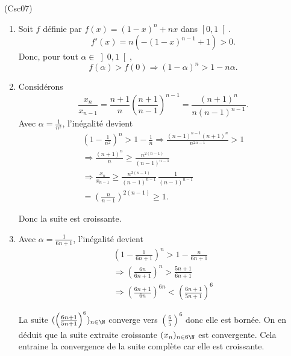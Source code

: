 \begin{tiny}(Csc07)\end{tiny}
\begin{enumerate}
  \item Soit $f$ définie par $f(x) = (1-x)^n + nx$ dans $\left[ 0, 1 \right[$.
\[
  f'(x) = n \left( -(1-x)^{n-1} +1\right) > 0.
\]
Donc, pour tout $\alpha \in \left]0 , 1 \right[$,
\[
  f(\alpha) > f(0)
  \Rightarrow (1- \alpha)^n > 1 - n\alpha.
\]

  \item Considérons 
\[
  \frac{x_{n}}{x_{n-1}} = \frac{n+1}{n} \left( \frac{n+1}{n-1}\right)^{n-1}
   = \frac{(n+1)^{n}}{n(n-1)^{n-1}}.
\]
Avec $\alpha = \frac{1}{n^2}$, l'inégalité devient
\begin{multline*}
  (1-\frac{1}{n^2})^n > 1 - \frac{1}{n} 
  \Rightarrow \frac{(n-1)^{n-1} (n+1)^{n}}{n^{2n-1}} > 1 \\
  \Rightarrow \frac{(n+1)^{n}}{n} \geq \frac{n^{2(n-1)}}{(n-1)^{n-1}}\\
  \Rightarrow \frac{x_{n}}{x_{n-1}} \geq \frac{n^{2(n-1)}}{(n-1)^{n-1}} \, \frac{1}{(n-1)^{n-1}} \\
  = \left(\frac{n}{n-1} \right)^{2(n-1)}\geq 1.
\end{multline*}

Donc la suite est croissante. 

  \item Avec $\alpha = \frac{1}{6n +1}$, l'inégalité devient
\begin{multline*}
  (1- \frac{1}{6n+1})^n > 1 - \frac{n}{6n + 1} \\
  \Rightarrow \left( \frac{6n}{6n + 1}\right)^n > \frac{5n + 1}{6n + 1}\\
  \Rightarrow \left( \frac{6n + 1}{6n}\right)^{6n} < \left( \frac{6n + 1}{5n + 1}\right)^6
\end{multline*}

La suite $(\left( \frac{6n + 1}{5n + 1}\right)^6)_{n\in \N}$ converge vers $(\frac{6}{5})^6$ donc elle est bornée. On en déduit que la suite extraite croissante $(x_n)_{n \in 6\N}$ est convergente. Cela entraine la convergence de la suite complète car elle est croissante. 
\end{enumerate}
